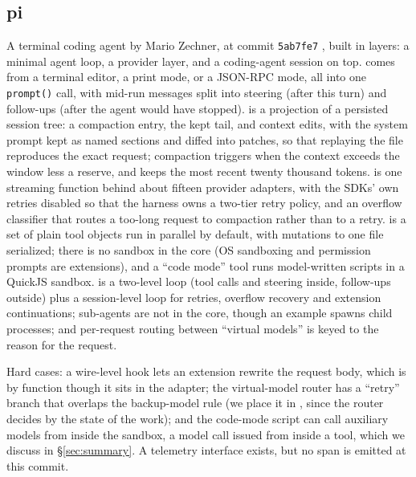 \subsection{pi}
A terminal coding agent by Mario Zechner, at commit \texttt{5ab7fe7} \citep{pi}, built in layers: a minimal agent loop, a provider layer, and a coding-agent session on top.  comes from a terminal editor, a print mode, or a JSON-RPC mode, all into one \texttt{prompt()} call, with mid-run messages split into steering (after this turn) and follow-ups (after the agent would have stopped).  is a projection of a persisted session tree: a compaction entry, the kept tail, and context edits, with the system prompt kept as named sections and diffed into patches, so that replaying the file reproduces the exact request; compaction triggers when the context exceeds the window less a reserve, and keeps the most recent twenty thousand tokens.  is one streaming function behind about fifteen provider adapters, with the SDKs' own retries disabled so that the harness owns a two-tier retry policy, and an overflow classifier that routes a too-long request to compaction rather than to a retry.  is a set of plain tool objects run in parallel by default, with mutations to one file serialized; there is no sandbox in the core (OS sandboxing and permission prompts are extensions), and a ``code mode'' tool runs model-written scripts in a QuickJS sandbox.  is a two-level loop (tool calls and steering inside, follow-ups outside) plus a session-level loop for retries, overflow recovery and extension continuations; sub-agents are not in the core, though an example spawns child processes; and per-request routing between ``virtual models'' is keyed to the reason for the request.

Hard cases: a wire-level hook lets an extension rewrite the request body, which is  by function though it sits in the adapter; the virtual-model router has a ``retry'' branch that overlaps the backup-model rule (we place it in , since the router decides by the state of the work); and the code-mode script can call auxiliary models from inside the sandbox, a model call issued from inside a tool, which we discuss in \S\ref{sec:summary}. A telemetry interface exists, but no span is emitted at this commit.

